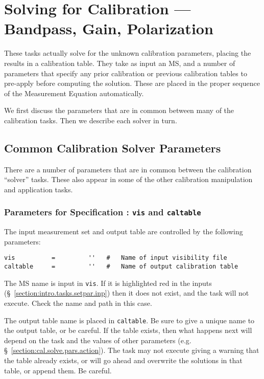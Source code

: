 \section{Solving for Calibration --- Bandpass, Gain, Polarization}
\label{section:cal.solve}

These tasks actually solve for the unknown calibration parameters,
placing the results in a calibration table.  They take as input
an MS, and a number of parameters that specify any prior calibration
or previous calibration tables to pre-apply before computing the
solution.  These are placed in the proper sequence of the Measurement
Equation automatically.

We first discuss the parameters that are in common between many
of the calibration tasks.  Then we describe each solver in turn.

\subsection{Common Calibration Solver Parameters}
\label{section:cal.solve.pars}

There are a number of parameters that are in common between 
the calibration ``solver'' tasks.  These also appear in some
of the other calibration manipulation and application tasks.

\subsubsection{Parameters for Specification : {\tt vis} and
{\tt caltable} }
\label{section:cal.solve.pars.spec}

The input measurement set and output table are
controlled by the following parameters:
\small
\begin{verbatim}
vis          =         ''   #   Name of input visibility file
caltable     =         ''   #   Name of output calibration table
\end{verbatim}
\normalsize

The MS name is input in {\tt vis}.  If it is highlighted red
in the inputs (\S~\ref{section:intro.tasks.setpar.inp}) then it 
does not exist, and the task will not execute.  Check the name and
path in this case. 

The output table name is placed in {\tt caltable}.  Be sure to give a
unique name to the output table, or be careful.  If the table exists,
then what happens next will depend on the task and the values of other
parameters (e.g.  \S~\ref{section:cal.solve.pars.action}).  The task
may not execute giving a warning that the table already exists, or
will go ahead and overwrite the solutions in that table, or append
them.  Be careful.

